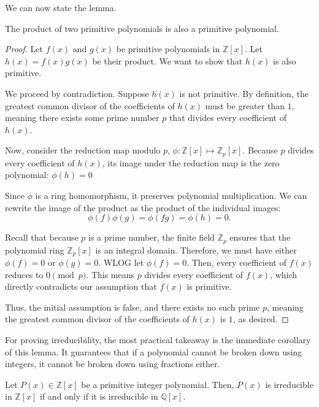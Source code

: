 \documentclass[11pt]{scrartcl}
\begin{document}
We can now state the lemma.

\begin{lemma*}
The product of two primitive polynomials is also a primitive polynomial.
\end{lemma*}
\begin{proof}
Let $f(x)$ and $g(x)$ be primitive polynomials in $\mathbb{Z}[x]$. Let $h(x) = f(x)g(x)$ be their product. We want to show that $h(x)$ is also primitive.

We proceed by contradiction. Suppose $h(x)$ is not primitive. By definition, the greatest common divisor of the coefficients of $h(x)$ must be greater than $1$, meaning there exists some prime number $p$ that divides every coefficient of $h(x)$.

Now, consider the reduction map modulo $p$, $\phi: \mathbb{Z}[x] \mapsto \mathbb{Z}_p[x]$. Because $p$ divides every coefficient of $h(x)$, its image under the reduction map is the zero polynomial: $\phi(h) = 0$

Since $\phi$ is a ring homomorphism, it preserves polynomial multiplication. We can rewrite the image of the product as the product of the individual images: \[\phi(f)\phi(g) = \phi(fg) = \phi(h) = 0.\]

Recall that because $p$ is a prime number, the finite field $\mathbb{Z}_p$ ensures that the polynomial ring $\mathbb{Z}_p[x]$ is an integral domain. Therefore, we must have either $\phi(f) = 0$ or $\phi(g) = 0$. WLOG let $\phi(f) = 0$. Then, every coefficient of $f(x)$ reduces to $0 \pmod p$. This means $p$ divides every coefficient of $f(x)$, which directly contradicts our assumption that $f(x)$ is primitive.

Thus, the initial assumption is false, and there exists no such prime $p$, meaning the greatest common divisor of the coefficients of $h(x)$ is $1$, as desired.
\end{proof}

For proving irreducibility, the most practical takeaway is the immediate corollary of this lemma. It guarantees that if a polynomial cannot be broken down using integers, it cannot be broken down using fractions either.

\begin{theorem*}
Let $P(x) \in \mathbb{Z}[x]$ be a primitive integer polynomial. Then, $P(x)$ is irreducible in $\mathbb{Z}[x]$ if and only if it is irreducible in $\mathbb{Q}[x]$.
\end{theorem*}
\end{document}
